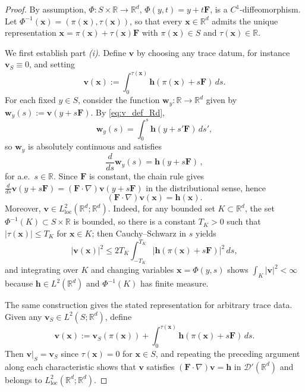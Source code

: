 \documentclass[12pt]{article}
\begin{document}
\begin{proof}
By assumption, $\Phi:S\times\mathbb R\to\mathbb R^d$, $\Phi(y,t)=y+t\mathbf F$, is a $C^1$-diffeomorphism.
Let $\Phi^{-1}(\boldsymbol x)=(\pi(\boldsymbol x),\tau(\boldsymbol x))$, so that every $\boldsymbol x\in\mathbb R^d$ admits the unique representation
$\boldsymbol x=\pi(\boldsymbol x)+\tau(\boldsymbol x)\mathbf F$ with $\pi(\boldsymbol x)\in S$ and $\tau(\boldsymbol x)\in\mathbb R$.

We first establish part \textit{(i)}. Define $\boldsymbol v$ by choosing any trace datum, for instance
$\boldsymbol v_S\equiv 0$, and setting
\begin{equation}\label{eq:v_def_Rd}
\boldsymbol v(\boldsymbol x):={{} \int_0^{\tau(\boldsymbol x)} \boldsymbol h(\pi(\boldsymbol x)+s\mathbf F)\,ds.}
\end{equation}
For each fixed $y\in S$, consider the function $\boldsymbol w_y:\mathbb R\to\mathbb R^d$ given by
$\boldsymbol w_y(s):=\boldsymbol v(y+s\mathbf F)$. By \eqref{eq:v_def_Rd},
\[
\boldsymbol w_y(s)={{} \int_0^s \boldsymbol h(y+s'\mathbf F)\,ds',}
\]
so $\boldsymbol w_y$ is absolutely continuous and satisfies
\[
\frac{d}{ds}\boldsymbol w_y(s)={{} \boldsymbol h(y+s\mathbf F)\,,}
\]
for a.e.~$s\in\mathbb{R}$. Since $\mathbf F$ is constant, the chain rule gives $\frac{d}{ds}\boldsymbol v(y+s\mathbf F)=(\mathbf F\cdot\nabla)\boldsymbol v(y+s\mathbf F)$
in the distributional sense, hence
\[
(\mathbf F\cdot\nabla)\boldsymbol v(\boldsymbol x)={{} \boldsymbol h(\boldsymbol x).}
\]
Moreover, $\boldsymbol v\in L^2_{\mathrm{loc}}(\mathbb R^d;\mathbb R^d)$. Indeed, for any bounded set $K\subset\mathbb R^d$,
the set $\Phi^{-1}(K)\subset S\times\mathbb R$ is bounded, so there is a constant $T_K>0$ such that $|\tau(\boldsymbol x)|\le T_K$ for $\boldsymbol x\in K$; then
Cauchy--Schwarz in $s$ yields
\[
|\boldsymbol v(\boldsymbol x)|^2
\le 2T_K \int_{-T_K}^{T_K} |\boldsymbol h(\pi(\boldsymbol x)+s\mathbf F)|^2\,ds,
\]
and integrating over $K$ and changing variables $\boldsymbol x=\Phi(y,s)$ shows $\int_K |\boldsymbol v|^2<\infty$
because $\boldsymbol h\in L^2(\mathbb R^d)$ and $\Phi^{-1}(K)$ has finite measure.

The same construction gives the stated representation for arbitrary trace data.
Given any $\boldsymbol v_S\in L^2(S;\mathbb R^d)$, define
\begin{equation}\label{eq:v_def_Rd_vs}
\boldsymbol v(\boldsymbol x):=\boldsymbol v_S(\pi(\boldsymbol x)) +\int_0^{\tau(\boldsymbol x)} \boldsymbol h(\pi(\boldsymbol x)+s\mathbf F)\,ds.
\end{equation}
Then $\boldsymbol v|_S=\boldsymbol v_S$ since $\tau(\boldsymbol x)=0$ for $\boldsymbol x\in S$, and repeating the preceding argument along each
characteristic shows that $\boldsymbol v$ satisfies $(\mathbf F\cdot\nabla)\boldsymbol v={{} \boldsymbol h}$
in $\mathcal D'(\mathbb R^d)$ and belongs to $L^2_{\mathrm{loc}}(\mathbb{R}^d; \mathbb{R}^d)$.


\end{proof}
\end{document}
